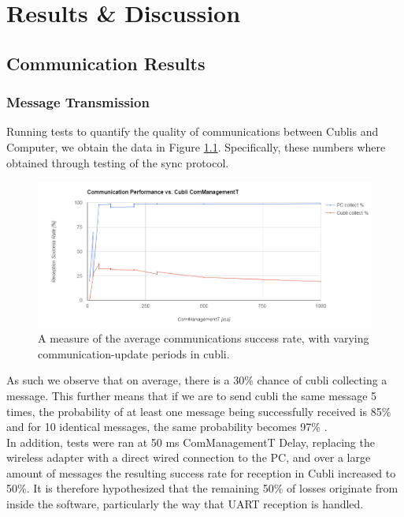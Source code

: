 \chapter{Results \& Discussion}\label{sec:results}

\section{Communication Results}

\subsection{Message Transmission}

Running tests to quantify the quality of communications between Cublis and Computer, we obtain the data in Figure \ref{img:comStats}. Specifically, these numbers where obtained through testing of the sync protocol.

\begin{figure}[H]
   \centering
   \includegraphics[width=1\textwidth]{img/comStats.png}
   \caption{A measure of the average communications success rate, with varying communication-update periods in cubli.}
   \label{img:comStats}
\end{figure}

As such we observe that on average, there is a 30\% chance of cubli collecting a message. This further means that if we are to send cubli the same message 5 times, the probability of at least one message being successfully received is 85\% and for 10 identical messages, the same probability becomes 97\% .\\

In addition, tests were ran at 50 ms ComManagementT Delay, replacing the wireless adapter with a direct wired connection to the PC, and over a large amount of messages the resulting success rate for reception in Cubli increased to 50\%. It is therefore hypothesized that the remaining 50\% of losses originate from inside the software, particularly the way that UART reception is handled.\\

